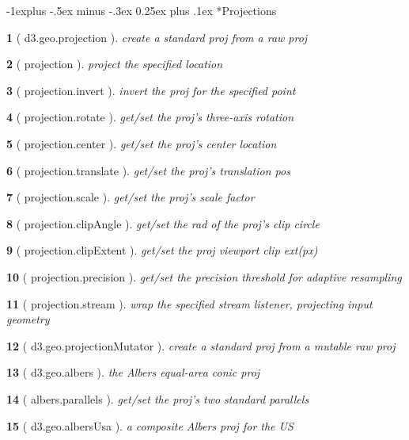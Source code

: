 \documentclass[10pt,landscape,letterpaper]{article}
\makeatletter
\newcounter{thm}
\theoremstyle{mytheoremstyle}
\newtheorem*{thm}{}
\renewcommand{\subsection}{\@startsection{subsection}{2}{0mm}%
                                {-1explus -.5ex minus -.3ex}%
                                {0.25ex plus .1ex}%
                                {\normalfont\normalsize\bfseries}}
\makeatother
\begin{document}
\begin{multicols}{3}
\subsection*{Projections}

\begin{thm} [ d3.geo.projection ]  create a standard proj from a raw proj
\end{thm}\begin{thm} [ projection ]  project the specified location
\end{thm}\begin{thm} [ projection.invert ]  invert the proj for the specified point
\end{thm}\begin{thm} [ projection.rotate ]  get/set the proj's three-axis rotation
\end{thm}\begin{thm} [ projection.center ]  get/set the proj's center location
\end{thm}\begin{thm} [ projection.translate ]  get/set the proj's translation pos
\end{thm}\begin{thm} [ projection.scale ]  get/set the proj's scale factor
\end{thm}\begin{thm} [ projection.clipAngle ]  get/set the rad of the proj's clip circle
\end{thm}\begin{thm} [ projection.clipExtent ]  get/set the proj viewport clip ext(px)
\end{thm}\begin{thm} [ projection.precision ]  get/set the precision threshold for adaptive resampling
\end{thm}\begin{thm} [ projection.stream ]  wrap the specified stream listener, projecting input geometry
\end{thm}\begin{thm} [ d3.geo.projectionMutator ]  create a standard proj from a mutable raw proj
\end{thm}\begin{thm} [ d3.geo.albers ]  the Albers equal-area conic proj
\end{thm}\begin{thm} [ albers.parallels ]  get/set the proj's two standard parallels
\end{thm}\begin{thm} [ d3.geo.albersUsa ]  a composite Albers proj for the US

\end{thm}
\end{multicols}
\end{document}
